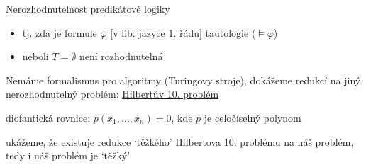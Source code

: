 \documentclass{beamer}
\begin{document}
\begin{frame}{Nerozhodnutelnost predikátové logiky}
    
    \pause

    \pause
    \begin{itemize}
        \item tj. zda je formule $\varphi$ [v lib. jazyce 1. řádu] tautologie ($\models\varphi$)\pause
        \item neboli $T=\emptyset$ není rozhodnutelná 
    \end{itemize}

    \pause
    Nemáme formalismus pro algoritmy (Turingovy stroje), dokážeme redukcí na jiný nerozhodnutelný problém: \alert{\href{https://en.wikipedia.org/wiki/Hilbert\%27s_problems}{Hilbertův 10. problém}}

    \bigskip

    \pause

    \medskip

    \pause
    \alert{diofantická rovnice}: $p(x_1,\dots,x_n)=0$, kde $p$ je celočíselný polynom

    \pause
    ukážeme, že existuje \alert{redukce} `těžkého' Hilbertova 10. problému na náš problém, tedy i náš problém je `těžký'
    
\end{frame}
\end{document}
